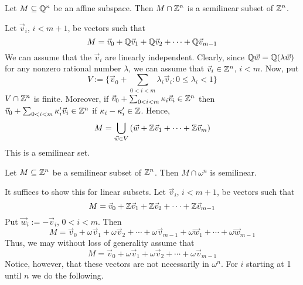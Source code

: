 \proofend
\begin{lem}
Let $M \subseteq \mathbb{Q}^n$ be an affine subspace. Then $M \cap \mathbb{Z}^n$ 
is a semilinear subset of $\mathbb{Z}^n$.
\end{lem}
\proofbeg
Let $\vec{v}_i$, $i < m+1$, be vectors such that 
\begin{equation}
M = \vec{v}_0 + \mathbb{Q} \vec{v}_1 + \mathbb{Q} \vec{v}_2 + \dotsb + 
\mathbb{Q} \vec{v}_{m-1}
\end{equation}
We can assume that the $\vec{v}_i$ are linearly independent. 
Clearly, since $\mathbb{Q} \vec{w} = \mathbb{Q} (\lambda \vec{w})$ for any 
nonzero rational number $\lambda$, we can assume that 
$\vec{v}_i \in \mathbb{Z}^n$, $i < m$.
Now, put 
\begin{equation}
V := \{\vec{v}_0 + \sum_{0 < i < m} \lambda_i \vec{v}_i : 
0 \leq \lambda_i < 1\}
\end{equation}
$V \cap \mathbb{Z}^n$ is finite. Moreover, if 
$\vec{v}_{0} + \sum_{0 < i < m} \kappa_i \vec{v}_i \in \mathbb{Z}^n$ 
then $\vec{v}_{0} + \sum_{0 < i < m} \kappa_i' \vec{v}_i 
\in \mathbb{Z}^n$ if $\kappa_i - \kappa_i' \in \mathbb{Z}$. Hence, 
\begin{equation}
M = \bigcup_{\vec{w} \in V} \left(\vec{w} + 
	\mathbb{Z} \vec{v}_1 + \dotsb + \mathbb{Z} \vec{v}_m\right)
\end{equation}
This is a semilinear set.
\proofend
\begin{lem}
Let $M \subseteq \mathbb{Z}^n$ be a semilinear subset of $\mathbb{Z}^n$. Then 
$M \cap \omega^n$ is semilinear. 
\end{lem}
\proofbeg
It suffices to show this for linear subsets.
Let $\vec{v}_i$, $i < m+1$, be vectors such that 
\begin{equation}
M = \vec{v}_0 + \mathbb{Z} \vec{v}_1 + \mathbb{Z} \vec{v}_2 + \dotsb + 
\mathbb{Z} \vec{v}_{m-1}
\end{equation}
Put $\vec{w}_i := - \vec{v}_i$, $0 < i < m$. Then 
\begin{equation}
M = \vec{v}_0 + \omega \vec{v}_1 + \omega \vec{v}_2 + \dotsb + 
\omega \vec{v}_{m-1} + \omega \vec{w}_1 + \dotsb + \omega \vec{w}_{m-1}
\end{equation}
Thus, we may without loss of generality assume that 
\begin{equation}
M = \vec{v}_0 + \omega \vec{v}_1 + \omega \vec{v}_2 + \dotsb + 
\omega \vec{v}_{m-1}
\end{equation}
Notice, however, that these vectors are not necessarily in $\omega^n$. 
For $i$ starting at 1 until $n$ we do the following. 

